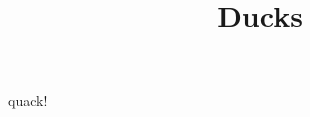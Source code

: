 \documentclass{article}
\title{Ducks}
\begin{document}
\maketitle

quack!

\cite{henderson20cvpr,anciukevicius20corr,henderson19ijcv,henderson18bmvc,henderson17corr,henderson16eccv,henderson16accv}




\end{document}
